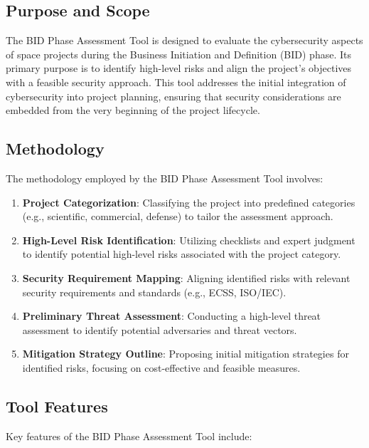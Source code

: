\documentclass[binding=0.6cm]{sapthesis}
\begin{document}
\subsection{Purpose and Scope}

The BID Phase Assessment Tool is designed to evaluate the cybersecurity aspects of space projects during the Business Initiation and Definition (BID) phase. Its primary purpose is to identify high-level risks and align the project’s objectives with a feasible security approach. This tool addresses the initial integration of cybersecurity into project planning, ensuring that security considerations are embedded from the very beginning of the project lifecycle.

\subsection{Methodology}

The methodology employed by the BID Phase Assessment Tool involves:

\begin{enumerate}
    \item \textbf{Project Categorization}: Classifying the project into predefined categories (e.g., scientific, commercial, defense) to tailor the assessment approach.
    \item \textbf{High-Level Risk Identification}: Utilizing checklists and expert judgment to identify potential high-level risks associated with the project category.
    \item \textbf{Security Requirement Mapping}: Aligning identified risks with relevant security requirements and standards (e.g., ECSS, ISO/IEC).
    \item \textbf{Preliminary Threat Assessment}: Conducting a high-level threat assessment to identify potential adversaries and threat vectors.
    \item \textbf{Mitigation Strategy Outline}: Proposing initial mitigation strategies for identified risks, focusing on cost-effective and feasible measures.
\end{enumerate}

\subsection{Tool Features}

Key features of the BID Phase Assessment Tool include:
\end{document}
